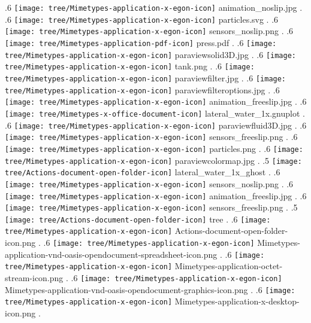 {.6 { \texttt{[image: tree/Mimetypes-application-x-egon-icon]} animation\_noslip.jpg }.
.6 { \texttt{[image: tree/Mimetypes-application-x-egon-icon]} particles.svg }.
.6 { \texttt{[image: tree/Mimetypes-application-x-egon-icon]} sensors\_noslip.png }.
.6 { \texttt{[image: tree/Mimetypes-application-pdf-icon]} press.pdf }.
.6 { \texttt{[image: tree/Mimetypes-application-x-egon-icon]} paraviewsolid3D.jpg }.
.6 { \texttt{[image: tree/Mimetypes-application-x-egon-icon]} tank.png }.
.6 { \texttt{[image: tree/Mimetypes-application-x-egon-icon]} paraviewfilter.jpg }.
.6 { \texttt{[image: tree/Mimetypes-application-x-egon-icon]} paraviewfilteroptions.jpg }.
.6 { \texttt{[image: tree/Mimetypes-application-x-egon-icon]} animation\_freeslip.jpg }.
.6 { \texttt{[image: tree/Mimetypes-x-office-document-icon]} lateral\_water\_1x.gnuplot }.
.6 { \texttt{[image: tree/Mimetypes-application-x-egon-icon]} paraviewfluid3D.jpg }.
.6 { \texttt{[image: tree/Mimetypes-application-x-egon-icon]} sensors\_freeslip.png }.
.6 { \texttt{[image: tree/Mimetypes-application-x-egon-icon]} particles.png }.
.6 { \texttt{[image: tree/Mimetypes-application-x-egon-icon]} paraviewcolormap.jpg }.
.5 { \texttt{[image: tree/Actions-document-open-folder-icon]} lateral\_water\_1x\_ghost }.
.6 { \texttt{[image: tree/Mimetypes-application-x-egon-icon]} sensors\_noslip.png }.
.6 { \texttt{[image: tree/Mimetypes-application-x-egon-icon]} animation\_freeslip.jpg }.
.6 { \texttt{[image: tree/Mimetypes-application-x-egon-icon]} sensors\_freeslip.png }.
.5 { \texttt{[image: tree/Actions-document-open-folder-icon]} tree }.
.6 { \texttt{[image: tree/Mimetypes-application-x-egon-icon]} Actions-document-open-folder-icon.png }.
.6 { \texttt{[image: tree/Mimetypes-application-x-egon-icon]} Mimetypes-application-vnd-oasis-opendocument-spreadsheet-icon.png }.
.6 { \texttt{[image: tree/Mimetypes-application-x-egon-icon]} Mimetypes-application-octet-stream-icon.png }.
.6 { \texttt{[image: tree/Mimetypes-application-x-egon-icon]} Mimetypes-application-vnd-oasis-opendocument-graphics-icon.png }.
.6 { \texttt{[image: tree/Mimetypes-application-x-egon-icon]} Mimetypes-application-x-desktop-icon.png }.
}
